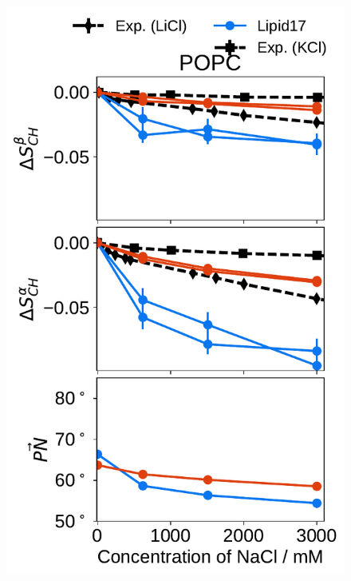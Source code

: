 \documentclass[journal=jpcbfk,manuscript=article]{achemso}
\newlength{\figheightsmall}
\newlength{\figheight}
\begin{document}
\begin{figure}[tbp!]
  \includegraphics[height=\figheightsmall]{../img/ecc_pops/order_parameters_changes_ecc-lip_L14_A-B-PN-COO_POPC_nacl.pdf} 

\end{figure}
\end{document}
